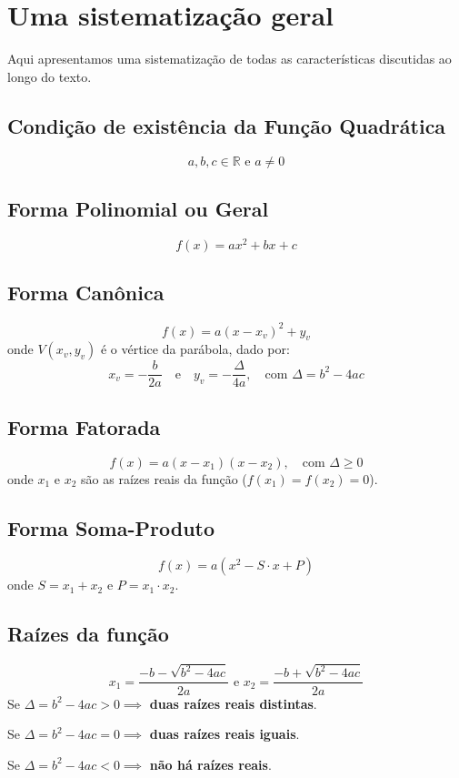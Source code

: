 \documentclass[12pt,a4paper]{report}
\begin{document}
	\chapter{Uma sistematização geral}
	Aqui apresentamos uma sistematização de todas as características discutidas ao longo do texto.
	\section{Condição de existência da Função Quadrática}
	\begin{destaque}
		$$a, b, c \in \mathbb{R} \text{ e } a \neq 0$$
	\end{destaque}
	\section{Forma Polinomial ou Geral}
	\begin{destaque}
		$$f(x) = ax^2 + bx + c$$
	\end{destaque}
	\section{Forma Canônica}
	\begin{destaque}
		$$f(x) = a(x - x_v)^2 + y_v$$
		onde $V(x_v, y_v)$ é o vértice da parábola, dado por:
		$$x_v = -\frac{b}{2a} \quad \text{e} \quad y_v = -\frac{\Delta}{4a}, \quad \text{com } \Delta = b^2 - 4ac$$
	\end{destaque}
	\section{Forma Fatorada}
	\begin{destaque}
		$$f(x) = a(x - x_1)(x - x_2), \quad \text{com } \Delta \geqslant 0$$
		onde $x_1$ e $x_2$ são as raízes reais da função ($f(x_1) = f(x_2) = 0$).
	\end{destaque}
	\section{Forma Soma-Produto}
	\begin{destaque}
		$$f(x) = a(x^2 - S \cdot x + P)$$
		onde $S = x_1 + x_2$ e $P=x_1 \cdot x_2$.
	\end{destaque}
	\section{Raízes da função}	
	\begin{destaque}
		$$x_1  = \frac{-b - \sqrt{b^2 - 4ac}}{2a} \text{ e } x_2  = \frac{-b + \sqrt{b^2 - 4ac}}{2a}$$
		Se $\Delta = b^2 -4ac > 0 \implies $  \textbf{duas raízes reais distintas}.
		
		Se $\Delta = b^2 -4ac = 0 \implies $  \textbf{duas raízes reais iguais}.
		
		Se $\Delta = b^2 -4ac < 0 \implies $ \textbf{não há raízes reais}.
	\end{destaque}		
\end{document}
